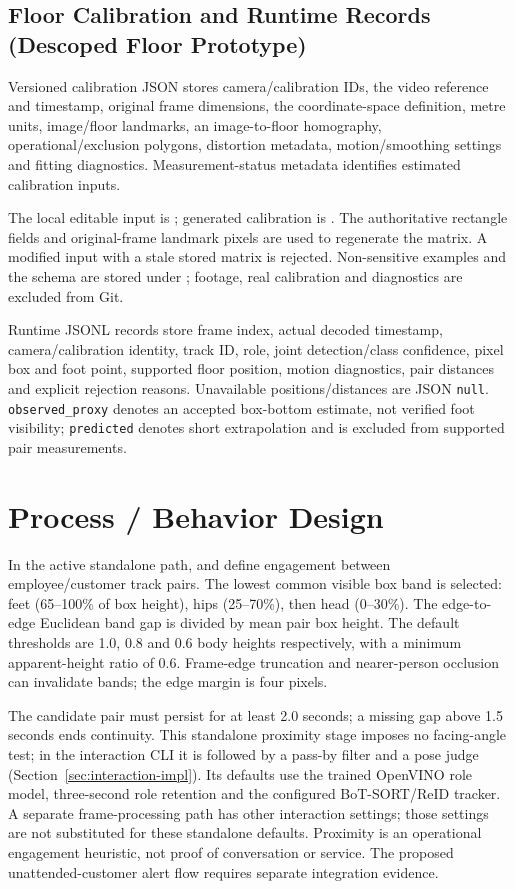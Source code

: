 \subsection{Floor Calibration and Runtime Records (Descoped Floor Prototype)}
Versioned calibration JSON stores camera/calibration IDs, the video reference and timestamp, original frame dimensions, the coordinate-space definition, metre units, image/floor landmarks, an image-to-floor homography, operational/exclusion polygons, distortion metadata, motion/smoothing settings and fitting diagnostics. Measurement-status metadata identifies estimated calibration inputs.

The local editable input is ; generated calibration is . The authoritative rectangle fields and original-frame landmark pixels are used to regenerate the matrix. A modified input with a stale stored matrix is rejected. Non-sensitive examples and the schema are stored under ; footage, real calibration and diagnostics are excluded from Git.

Runtime JSONL records store frame index, actual decoded timestamp, camera/calibration identity, track ID, role, joint detection/class confidence, pixel box and foot point, supported floor position, motion diagnostics, pair distances and explicit rejection reasons. Unavailable positions/distances are JSON \texttt{null}. \texttt{observed\_proxy} denotes an accepted box-bottom estimate, not verified foot visibility; \texttt{predicted} denotes short extrapolation and is excluded from supported pair measurements.

\section{Process / Behavior Design}


In the active standalone  path,  and  define engagement between employee/customer track pairs. The lowest common visible box band is selected: feet (65--100\% of box height), hips (25--70\%), then head (0--30\%). The edge-to-edge Euclidean band gap is divided by mean pair box height. The default thresholds are 1.0, 0.8 and 0.6 body heights respectively, with a minimum apparent-height ratio of 0.6. Frame-edge truncation and nearer-person occlusion can invalidate bands; the edge margin is four pixels.

The candidate pair must persist for at least 2.0 seconds; a missing gap above 1.5 seconds ends continuity. This standalone proximity stage imposes no facing-angle test; in the interaction CLI it is followed by a pass-by filter and a pose judge (Section~\ref{sec:interaction-impl}). Its defaults use the trained OpenVINO role model, three-second role retention and the configured BoT-SORT/ReID tracker. A separate frame-processing path has other interaction settings; those settings are not substituted for these standalone defaults. Proximity is an operational engagement heuristic, not proof of conversation or service. The proposed unattended-customer alert flow requires separate integration evidence.

